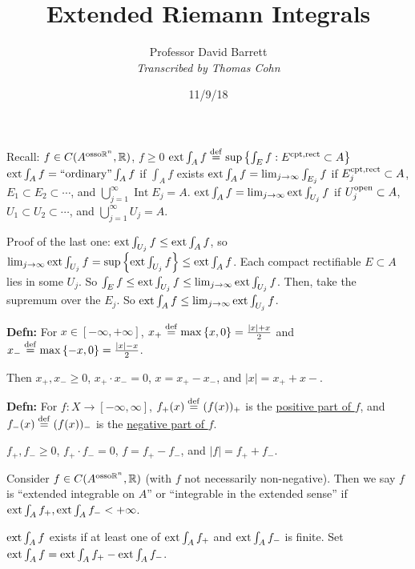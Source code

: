 \documentclass[10pt,letterpaper]{article}
\author{Professor David Barrett\\ \small\textit{Transcribed by Thomas Cohn}}
\title{Extended Riemann Integrals}
\date{11/9/18} %
\newcommand{\n}{\hfill\break}
\newcommand{\defn}[1]{\par\noindent\settowidth{\hangindent}{\textbf{Defn: }}\textbf{Defn: }#1\n}
\newcommand{\ptxt}[1]{\textrm{\textnormal{#1}}}
\newcommand{\set}[1]{\left\{#1\right\}}
\newcommand{\reals}{\mathbb{R}}
\newcommand{\R}{\reals}
\newcommand{\abs}[1]{\left|#1\right|}
\DeclareMathOperator{\Int}{Int}
\newcommand{\extint}{\ptxt{ext}\int}
\begin{document}
\maketitle
\setlength\RaggedRightParindent{\parindent}
\RaggedRight

\par\noindent Recall: $f\in{}C(A^{\ptxt{osso}\R^{n}},\R)$, $f\ge{}0$\n
$\extint_{A}f\overset{\ptxt{def}}{=}\sup\set{\int_{E}f:E^{\ptxt{cpt},\ptxt{rect}}\subset{}A}$\n
$\extint_{A}f=\ptxt{``ordinary''}\int_{A}f$ if $\int_{A}f$ exists\n
$\extint_{A}f=\lim_{j\to\infty}\int_{E_{j}}f$ if $E_{j}^{\ptxt{cpt},\ptxt{rect}}\subset{}A$, $E_{1}\subset{}E_{2}\subset\cdots$, and $\bigcup_{j=1}^{\infty}\Int{}E_{j}=A$.\n
$\extint_{A}f=\lim_{j\to\infty}\extint_{U_{j}}f$ if $U_{j}^{\ptxt{open}}\subset{}A$, $U_{1}\subset{}U_{2}\subset\cdots$, and $\bigcup_{j=1}^{\infty}U_{j}=A$.\n

\par\noindent Proof of the last one: $\extint_{U_{j}}f\le\extint_{A}f$, so $\lim_{j\to\infty}\extint_{U_{j}}f=\sup\set{\extint_{U_{j}}f}\le\extint_{A}f$.\n
Each compact rectifiable $E\subset{}A$ lies in some $U_{j}$. So $\int_{E}f\le\extint_{U_{j}}f\le\lim_{j\to\infty}\extint_{U_{j}}f$.\n
Then, take the supremum over the $E_{j}$. So $\extint_{A}f\le\lim_{j\to\infty}\extint_{U_{j}}f$.\n

\defn{For $x\in[-\infty,+\infty]$, $x_{+}\overset{\ptxt{def}}{=}\max\set{x,0}=\frac{\abs{x}+x}{2}$ and $x_{-}\overset{\ptxt{def}}{=}\max{\set{-x,0}}=\frac{\abs{x}-x}{2}$.}

\par\noindent Then $x_{+},x_{-}\ge{}0$, $x_{+}\cdot{}x_{-}=0$, $x=x_{+}-x_{-}$, and $\abs{x}=x_{+}+x{-}$.\n

\defn{For $f:X\to[-\infty,\infty]$, $f_{+}(x)\overset{\ptxt{def}}{=}(f(x))_{+}$ is the \underline{positive part of $f$}, and $f_{-}(x)\overset{\ptxt{def}}{=}(f(x))_{-}$ is the \underline{negative part of $f$}.}

\par\noindent $f_{+},f_{-}\ge{}0$, $f_{+}\cdot{}f_{-}=0$, $f=f_{+}-f_{-}$, and $\abs{f}=f_{+}+f_{-}$.\n

\par\noindent Consider $f\in{}C(A^{\ptxt{osso}\R^{n}},\R)$ (with $f$ not necessarily non-negative). Then we say $f$ is ``extended integrable on $A$'' or ``integrable in the extended sense'' if $\extint_{A}f_{+},\extint_{A}f_{-}<+\infty$.\n

\par\noindent $\extint_{A}f$ exists if at least one of $\extint_{A}f_{+}$ and $\extint_{A}f_{-}$ is finite. Set $\extint_{A}f=\extint_{A}f_{+}-\extint_{A}f_{-}$.\n
\end{document}
